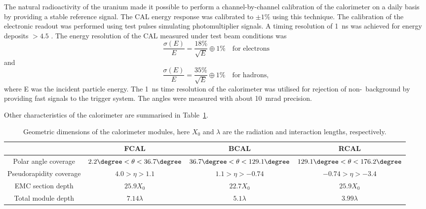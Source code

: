 The natural radioactivity of the uranium made it possible to perform a channel-by-channel calibration of the calorimeter on a daily basis by providing a stable reference signal. The CAL energy response was calibrated to $\pm 1\%$ using this technique. The calibration of the electronic readout was performed using test pulses simulating photomultiplier signals. A timing resolution of 1~ns was achieved for energy deposits $> 4.5$ \GeV.
The energy resolution of the CAL measured under test beam conditions was 
\begin{equation}
	\frac{\sigma \left(E\right)}{E} = \frac{18\%}{\sqrt{E}} \oplus 1\% \quad \text{for electrons}
\end{equation}
and 
\begin{equation}
	\frac{\sigma \left(E\right)}{E} = \frac{35\%}{\sqrt{E}} \oplus 1\% \quad \text{for hadrons},
\end{equation}
where E was the incident particle energy. The 1~ns time resolution of the calorimeter was utilised for rejection of non-\ep~background by providing fast signals to the trigger system. The angles were measured with about 10~mrad precision.

Other characteristics of the \zeus calorimeter are summarised in Table~\ref{tab:calparams}.

\begin{table}[htbp]
	\centering
	{\small
		\begin{tabular}{|c|c|c|c|}
			     \hline
      &FCAL & BCAL & RCAL \\
			\hline
			\hline
			Polar angle coverage & $2.2\degree < \theta < 36.7\degree$ & $36.7\degree < \theta < 129.1\degree$ & $129.1\degree < \theta < 176.2\degree$ \\ \hline
			Pseudorapidity coverage & $4.0 > \eta > 1.1$ & $1.1 > \eta > -0.74$ & $-0.74 > \eta > -3.4$ \\ \hline
			EMC section depth & $25.9 X_0$ & $22.7 X_0$ & $25.9 X_0$ \\ \hline
			Total module depth & $7.14 \lambda$ & $5.1 \lambda$ & $3.99 \lambda$ \\ \hline		
		\end{tabular}
	}
	\caption{Geometric dimensions of the calorimeter modules, here $X_0$ and $\lambda$ are the radiation and interaction lengths, respectively.}
	\label{tab:calparams}
\end{table}
